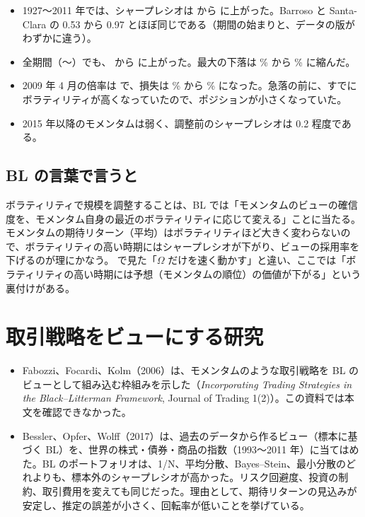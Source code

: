 \begin{itemize}
\item 1927〜2011 年では、シャープレシオは  から  に上がった。Barroso と Santa-Clara の 0.53 から 0.97 とほぼ同じである（期間の始まりと、データの版がわずかに違う）。
\item 全期間（〜）でも、 から  に上がった。最大の下落は \% から \% に縮んだ。
\item 2009 年 4 月の倍率は  で、損失は \% から \% になった。急落の前に、すでにボラティリティが高くなっていたので、ポジションが小さくなっていた。
\item 2015 年以降のモメンタムは弱く、調整前のシャープレシオは 0.2 程度である。
\end{itemize}

\subsection*{BL の言葉で言うと}

ボラティリティで規模を調整することは、BL では「モメンタムのビューの確信度を、モメンタム自身の最近のボラティリティに応じて変える」ことに当たる。モメンタムの期待リターン（平均）はボラティリティほど大きく変わらないので、ボラティリティの高い時期にはシャープレシオが下がり、ビューの採用率を下げるのが理にかなう。 で見た「$\Omega$ だけを速く動かす」と違い、ここでは「ボラティリティの高い時期には予想（モメンタムの順位）の価値が下がる」という裏付けがある。

\section{取引戦略をビューにする研究}

\begin{itemize}
\item Fabozzi、Focardi、Kolm（2006）は、モメンタムのような取引戦略を BL のビューとして組み込む枠組みを示した（\textit{Incorporating Trading Strategies in the Black--Litterman Framework}, Journal of Trading 1(2)）。この資料では本文を確認できなかった。
\item Bessler、Opfer、Wolff（2017）は、過去のデータから作るビュー（標本に基づく BL）を、世界の株式・債券・商品の指数（1993〜2011 年）に当てはめた。BL のポートフォリオは、1/N、平均分散、Bayes--Stein、最小分散のどれよりも、標本外のシャープレシオが高かった。リスク回避度、投資の制約、取引費用を変えても同じだった。理由として、期待リターンの見込みが安定し、推定の誤差が小さく、回転率が低いことを挙げている。
\end{itemize}

